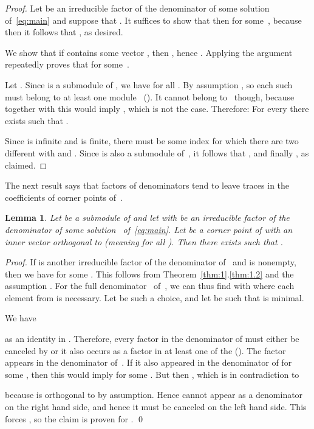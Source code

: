 \documentclass[a4paper]{sig-alternate}
\newtheorem{lemma}{Lemma}
\begin{document}
\begin{proof}
  Let  be an irreducible factor of the denominator of some solution
  of~\eqref{eq:main} and suppose that . It suffices
  to show that then  for some~, because then it follows that
  , as desired.

  We show that if  contains some vector , then
  , hence .
  Applying the argument repeatedly proves that  for some~.

  Let . Since  is a submodule of , we have  for all .  By assumption , so each such  must belong to at
  least one module~ (). It cannot belong to~ though,
  because together with  this would imply , which
  is not the case. Therefore: For every  there exists
   such that .

  Since  is infinite and  is finite, there must be some index
   for which there are two different
   with  and
  . Since  is also a submodule of~, it follows that , and finally , as claimed.
\end{proof}

The next result says that factors of denominators tend to leave traces in the
coefficients of corner points of~.

\begin{lemma}\label{lem:2}
  Let  be a submodule of  and let  with 
  be an irreducible factor of the denominator of some solution~ of~\eqref{eq:main}.
  Let  be a corner point of  with an inner vector 
  orthogonal to  (meaning  for all ).
  Then there exists  such that .
\end{lemma}

\begin{proof}
  If  is another irreducible factor of the denominator of~ and
   is nonempty, then we have  for some .
  This follows from Theorem~\ref{thm:1}.\ref{thm:1.2} and the assumption .
  For the full denominator~ of~, we can thus find 
  with  where each element
  from  is necessary.
  Let  be such a choice, and let  be such that
   is minimal.

  We have
  
  as an identity in . Therefore, every factor in the denominator of 
  must either be canceled by  or it also occurs as a factor in at least
  one of the  ().
  The factor  appears in the denominator of~.
  If it also appeared in the denominator of  for some ,
  then this would imply  for some .
  But then , which is in contradiction to
  
  because  is orthogonal to  by assumption.
  Hence  cannot appear as a denominator on the right hand side,
  and hence it must be canceled on the left hand side.
  This forces , so the claim is proven for
  . \qed
\end{proof}
\end{document}
